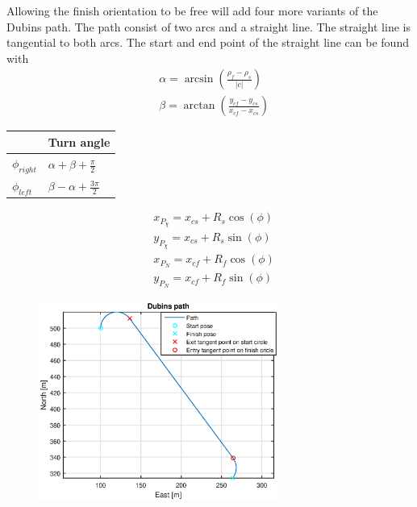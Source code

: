 Allowing the finish orientation to be free will add four more variants of the Dubins path.
The path consist of two arcs and a straight line. The straight line is tangential to both arcs. The start and end point of the straight line can be found with
\begin{subequations}
\begin{align}
& \alpha = \arcsin(\frac{\rho_f-\rho_s}{|c|}) \\
& \beta = \arctan(\frac{y_{cf}-y_{cs}}{x_{cf}-x_{cs}})
\end{align}
\end{subequations}

\begin{table}[H]
\begin{center}
\begin{tabular}{ | l | | l |}
\hline
& \textbf{Turn angle} \\ \hline
$\phi_{right}$ & $\alpha + \beta + \frac{\pi}{2}$ \\
$\phi_{left}$ & $\beta - \alpha + \frac{3\pi}{2}$ \\ \hline
\end{tabular}
\end{center}
\end{table}

\begin{subequations}
\begin{align}
& x_{P_\chi} = x_{cs} + R_s\cos(\phi) \\
& y_{P_\chi} = x_{cs} + R_s\sin(\phi) \\
& x_{P_N} = x_{cf} + R_f\cos(\phi) \\
& y_{P_N} = x_{cf} + R_f\sin(\phi)
\end{align}
\end{subequations}
\begin{figure}[H]
\includegraphics[width=0.7\textwidth]{figs/TheoryPlot/DubinsPath.eps}
\end{figure}